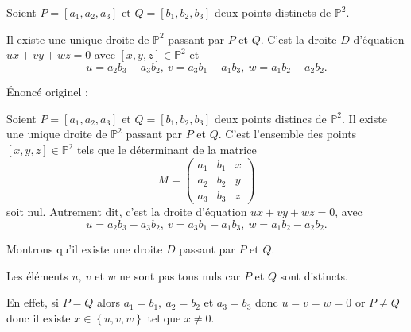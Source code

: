 
\begin{lemme}
    Soient $P = \left[ a_1, a_2, a_3 \right]$ et $Q = \left[ b_1, b_2, b_3 \right]$ deux points distincts de $\mathbb{P}^2$.

    Il existe une unique droite de $\mathbb{P}^2$ passant par $P$ et $Q$. C'est la droite $D$ d'équation $ux + vy + wz = 0$ avec $\left[ x, y, z \right] \in \mathbb{P}^2$ et 
    \[
    u = a_2 b_3 - a_3 b_2, \ v = a_3 b_1 - a_1 b_3, \ w = a_1 b_2 - a_2 b_2 
    .\] 

    Énoncé originel : 

    Soient $P = \left[ a_1, a_2, a_3 \right]$ et $Q = \left[ b_1, b_2, b_3 \right]$ deux points distincs de $\mathbb{P}^2$. Il existe une unique droite de $\mathbb{P}^2$ passant par $P$ et $Q$. C'est l'ensemble des points $\left[ x, y, z \right] \in \mathbb{P}^2$ tels que le déterminant de la matrice
    \[
        M = 
    \begin{pmatrix}
        a_1 & b_1 & x \\ 
        a_2 & b_2 & y \\
        a_3 & b_3 & z
    \end{pmatrix}
    \] 
    soit nul. Autrement dit, c'est la droite d'équation $ux + vy + wz = 0$, avec
    \[
    u = a_2b_3 - a_3b_2, \ v = a_3b_1 - a_1b_3, \ w = a_1b_2 - a_2b_2
    .\] 
\end{lemme}

\begin{demonstration}
    Montrons qu'il existe une droite $D$ passant par $P$ et $Q$.

    Les éléments $u, \ v$ et $w$ ne sont pas tous nuls car $P$ et $Q$ sont distincts.

    En effet, si $P = Q$ alors $a_1 = b_1, \ a_2 = b_2 $ et $a_3 = b_3$ donc $u = v = w =0$ or $P \neq Q$ donc il existe $x \in \left\{ u, v, w \right\}$ tel que $x \neq 0$.
    
\end{demonstration}
